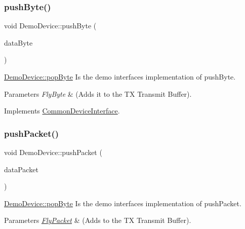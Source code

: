 \subsubsection{\texorpdfstring{push\+Byte()}{pushByte()}}
{\footnotesize\ttfamily void Demo\+Device\+::push\+Byte (\begin{DoxyParamCaption}\item[{Fly\+Byte}]{data\+Byte }\end{DoxyParamCaption})\hspace{0.3cm}{\ttfamily [virtual]}}



\hyperlink{class_demo_device_a788dd7e426fab9c8d19ea9fd106260d4}{Demo\+Device\+::pop\+Byte} Is the demo interface\textquotesingle{}s implementation of push\+Byte. 


\begin{DoxyParams}{Parameters}
{\em Fly\+Byte} & (Adds it to the TX Transmit Buffer). \\
\hline
\end{DoxyParams}


Implements \hyperlink{class_common_device_interface}{Common\+Device\+Interface}.

\hypertarget{class_demo_device_ac39f46589b28926cd40635ad42342a54}{}\label{class_demo_device_ac39f46589b28926cd40635ad42342a54} 
\subsubsection{\texorpdfstring{push\+Packet()}{pushPacket()}}
{\footnotesize\ttfamily void Demo\+Device\+::push\+Packet (\begin{DoxyParamCaption}\item[{\hyperlink{class_fly_packet}{Fly\+Packet}}]{data\+Packet }\end{DoxyParamCaption})\hspace{0.3cm}{\ttfamily [virtual]}}



\hyperlink{class_demo_device_a788dd7e426fab9c8d19ea9fd106260d4}{Demo\+Device\+::pop\+Byte} Is the demo interface\textquotesingle{}s implementation of push\+Packet. 


\begin{DoxyParams}{Parameters}
{\em \hyperlink{class_fly_packet}{Fly\+Packet}} & (Adds to the TX Transmit Buffer). \\
\hline
\end{DoxyParams}


